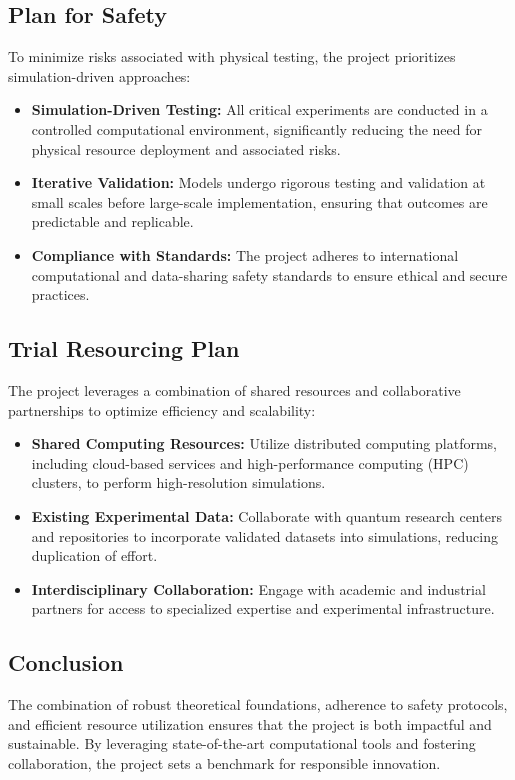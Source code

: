 \documentclass{article}
\theoremstyle{plain}
\begin{document}
\subsection*{Plan for Safety}
To minimize risks associated with physical testing, the project prioritizes simulation-driven approaches:
\begin{itemize}
    \item \textbf{Simulation-Driven Testing:} All critical experiments are conducted in a controlled computational environment, significantly reducing the need for physical resource deployment and associated risks.
    \item \textbf{Iterative Validation:} Models undergo rigorous testing and validation at small scales before large-scale implementation, ensuring that outcomes are predictable and replicable.
    \item \textbf{Compliance with Standards:} The project adheres to international computational and data-sharing safety standards to ensure ethical and secure practices.
\end{itemize}

\subsection{Trial Resourcing Plan}
The project leverages a combination of shared resources and collaborative partnerships to optimize efficiency and scalability:
\begin{itemize}
    \item \textbf{Shared Computing Resources:} Utilize distributed computing platforms, including cloud-based services and high-performance computing (HPC) clusters, to perform high-resolution simulations.
    \item \textbf{Existing Experimental Data:} Collaborate with quantum research centers and repositories to incorporate validated datasets into simulations, reducing duplication of effort.
    \item \textbf{Interdisciplinary Collaboration:} Engage with academic and industrial partners for access to specialized expertise and experimental infrastructure.
\end{itemize}

\subsection{Conclusion}
The combination of robust theoretical foundations, adherence to safety protocols, and efficient resource utilization ensures that the project is both impactful and sustainable. By leveraging state-of-the-art computational tools and fostering collaboration, the project sets a benchmark for responsible innovation.



\end{document}

